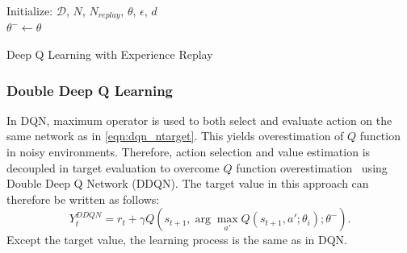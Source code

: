\begin{algorithm}[H]
	\SetAlgoLined
	\DontPrintSemicolon %
	Initialize: $\mathcal{D}$, $N$, $N_{replay}$, $\theta$, $\epsilon$, $d$ \\
	$\theta^- \leftarrow \theta$ \\
	\caption{Deep Q Learning with Experience Replay}
	\label{alg:dqn}
\end{algorithm}

\subsubsection{Double Deep Q Learning}
In DQN, maximum operator is used to both select and evaluate action on the same network as in \eqref{eqn:dqn_ntarget}. 
This yields overestimation of $Q$ function in noisy environments. 
Therefore, action selection and value estimation is decoupled in target evaluation to overcome $Q$ function overestimation~\cite{van_hasselt_deep_2015} using Double Deep Q Network (DDQN). 
The target value in this approach can therefore be written as follows:
\begin{equation}
\label{eqn:ddqn_ntarget}
Y_t^{DDQN} = r_t + \gamma Q(s_{t+1}, \arg\max_{a'} Q(s_{t+1}, a'; \theta_i );\theta^-).
\end{equation}
Except the target value, the learning process is the same as in DQN. 

